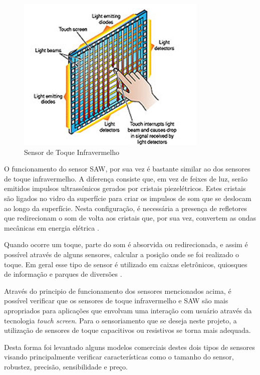 \begin{anexosenv}
\begin{figure}[htb]
		\centering
			\includegraphics[scale=0.7]{figuras/infra.png}
		\caption{Sensor de Toque Infravermelho}
		\label{fig14}
\end{figure}



O funcionamento do sensor SAW, por sua vez é bastante similar ao dos sensores de toque infravermelho. A diferença consiste que, em vez de feixes de luz, serão emitidos impulsos ultrassônicos gerados por cristais piezelétricos. Estes cristais são ligados no vidro da superfície para criar os impulsos de som que se deslocam ao longo da superfície. Nesta configuração, é necessária a presença de refletores que redirecionam o som de volta aos cristais que, por sua vez, convertem as ondas mecânicas em energia elétrica \cite{mathas}.  

Quando ocorre um toque, parte do som é absorvida ou redirecionada, e assim é possível através de alguns sensores, calcular a posição onde se foi realizado o toque. Em geral esse tipo de sensor é utilizado em caixas eletrônicos, quiosques de informação e parques de diversões \cite{mathas}.

Através do principio de funcionamento dos sensores mencionados acima, é possível verificar que os sensores de toque infravermelho e SAW são mais apropriados para aplicações que envolvam uma interação com usuário através da tecnologia \textit{touch screen}. Para o sensoriamento que se deseja neste projeto, a utilização de sensores de toque capacitivos ou resistivos se torna mais adequada.

Desta forma foi levantado alguns modelos comerciais destes dois tipos de sensores visando principalmente verificar características como o tamanho do sensor, robustez, precisão, sensibilidade e preço.


\end{anexosenv}
